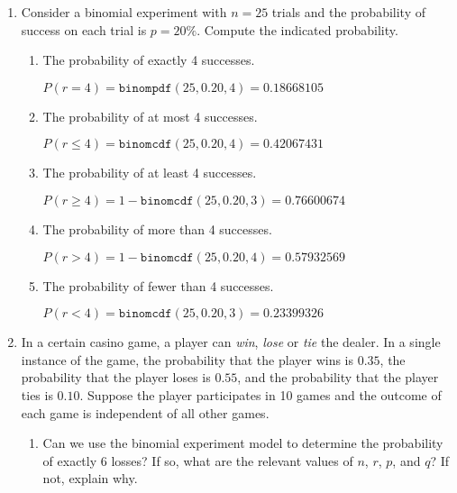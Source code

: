 \documentclass{article}
\newcommand{\answer}[1]{\color{red}#1}
\begin{document}
\pagestyle{myheadings}

\begin{center}
\textbf{}
\end{center}

\begin{enumerate}

\item Consider a binomial experiment with $n=25$ trials and the probability of success on each trial is $p = 20\%$.  Compute the indicated probability.

	\begin{enumerate}
	\item The probability of exactly 4 successes. 
	
	{\answer $P(r = 4) = \texttt{binompdf}(25, 0.20, 4) = 0.18668105$
	} 
	
	\item The probability of at most 4 successes. 
	
	{\answer $P(r \leq 4) = \texttt{binomcdf}(25, 0.20, 4) = 0.42067431$
	} 
	
	\item The probability of at least 4 successes. 
	
	{\answer $P(r \geq 4) = 1- \texttt{binomcdf}(25, 0.20, 3) = 0.76600674$
	} 
	
	
	\item The probability of more than 4 successes. 
	
	{\answer $P(r > 4) = 1 - \texttt{binomcdf}(25, 0.20, 4) = 0.57932569$
	} 
	
	\item The probability of fewer than 4 successes. 
	
	{\answer $P(r < 4) = \texttt{binomcdf}(25, 0.20, 3) = 0.23399326$
	}
	\end{enumerate}

\item In a certain casino game, a player can {\em win}, {\em lose} or {\em tie} the dealer.  In a single instance of the game, the probability that the player wins is $0.35$, the probability that the player loses is $0.55$, and the probability that the player ties is $0.10$.  Suppose the player participates in 10 games and the outcome of each game is independent of all other games. 

	\begin{enumerate}
	\item Can we use the binomial experiment model to determine the probability of exactly 6 losses?  If so, what are the relevant values of $n$, $r$, $p$, and $q$?  If not, explain why. 
	

\end{enumerate}
\end{enumerate}
\end{document}
